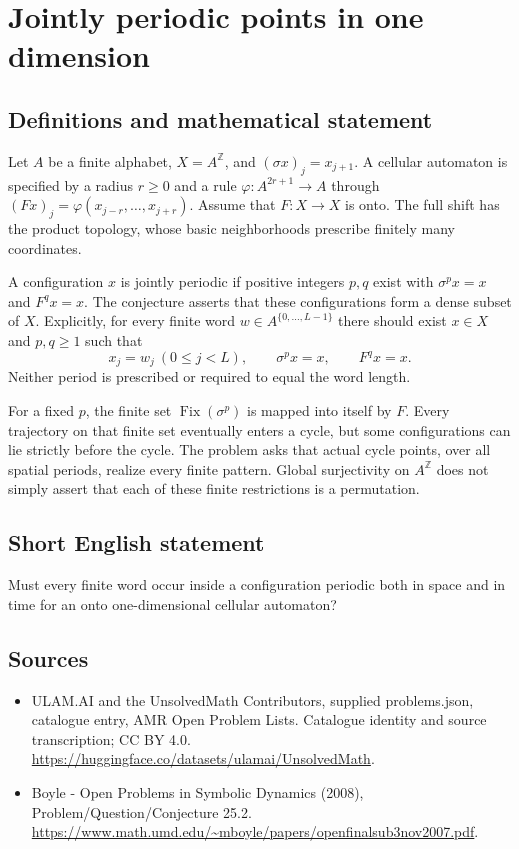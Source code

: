 \documentclass[11pt,a4paper]{article}
\begin{document}
\section*{Jointly periodic points in one dimension}\label{statement}

\subsection{Definitions and mathematical statement}
Let $A$ be a finite alphabet, $X=A^{\mathbb Z}$, and
$(\sigma x)_j=x_{j+1}$. A cellular automaton is specified by a
radius $r\ge0$ and a rule $\varphi:A^{2r+1}\to A$ through
$(Fx)_j=\varphi(x_{j-r},\ldots,x_{j+r})$. Assume that
$F:X\to X$ is onto. The full shift has the product topology,
whose basic neighborhoods prescribe finitely many coordinates.

A configuration $x$ is jointly periodic if positive integers
$p,q$ exist with $\sigma^p x=x$ and $F^q x=x$.
The conjecture asserts that these configurations form a dense
subset of $X$. Explicitly, for every finite word
$w\in A^{\{0,\ldots,L-1\}}$ there should exist $x\in X$ and
$p,q\ge1$ such that
\[
        x_j=w_j\ (0\le j<L),\qquad
        \sigma^p x=x,\qquad F^q x=x.
\]
Neither period is prescribed or required to equal the word length.

For a fixed $p$, the finite set $\operatorname{Fix}(\sigma^p)$
is mapped into itself by $F$. Every trajectory on that finite
set eventually enters a cycle, but some configurations can lie
strictly before the cycle. The problem asks that actual cycle
points, over all spatial periods, realize every finite pattern.
Global surjectivity on $A^{\mathbb Z}$ does not simply assert
that each of these finite restrictions is a permutation.
\subsection{Short English statement}
Must every finite word occur inside a configuration periodic both in space and in time for an onto one-dimensional cellular automaton?
\subsection{Sources}
\begin{itemize}
\item[S1] ULAM.AI and the UnsolvedMath Contributors, supplied problems.json, catalogue entry, AMR Open Problem Lists. Catalogue identity and source transcription; CC BY 4.0.
\url{https://huggingface.co/datasets/ulamai/UnsolvedMath}.
\item[S2] Boyle - Open Problems in Symbolic Dynamics (2008), Problem/Question/Conjecture 25.2. 
\url{https://www.math.umd.edu/~mboyle/papers/openfinalsub3nov2007.pdf}.
\end{itemize}
\end{document}
